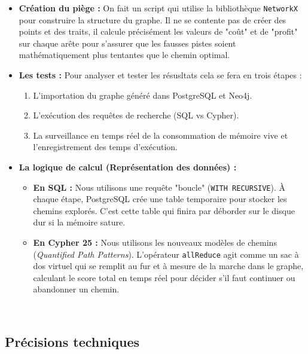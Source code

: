 \documentclass{article}
\begin{document}
    \begin{itemize}
        \item \textbf{Création du piège :} On fait un script qui utilise la bibliothèque \texttt{NetworkX} pour construire la structure du graphe. Il ne se contente pas de créer des points et des traits, il calcule précisément les valeurs de "coût" et de "profit" sur chaque arête pour s'assurer que les fausses pistes soient mathématiquement plus tentantes que le chemin optimal.
        
        \item \textbf{Les tests :} Pour analyser et tester les résusltats cela se fera en trois étapes : 
            \begin{enumerate}
                \item L'importation du graphe généré dans PostgreSQL et Neo4j.
                \item L'exécution des requêtes de recherche (SQL vs Cypher).
                \item La surveillance en temps réel de la consommation de mémoire vive et l'enregistrement des temps d'exécution.
        \end{enumerate}
        
        \item \textbf{La logique de calcul (Représentation des données) :} 
            \begin{itemize}
                \item \textbf{En SQL :} Nous utilisons une requête "boucle" (\texttt{WITH RECURSIVE}). À chaque étape, PostgreSQL crée une table temporaire pour stocker les chemins explorés. C'est cette table qui finira par déborder sur le disque dur si la mémoire sature.
                \item \textbf{En Cypher 25 :} Nous utilisons les nouveaux modèles de chemins (\textit{Quantified Path Patterns}). L'opérateur \texttt{allReduce} agit comme un sac à dos virtuel qui se remplit au fur et à mesure de la marche dans le graphe, calculant le score total en temps réel pour décider s'il faut continuer ou abandonner un chemin.
        \end{itemize}

    \end{itemize} \\

    \subsection{Précisions techniques}
\end{document}
